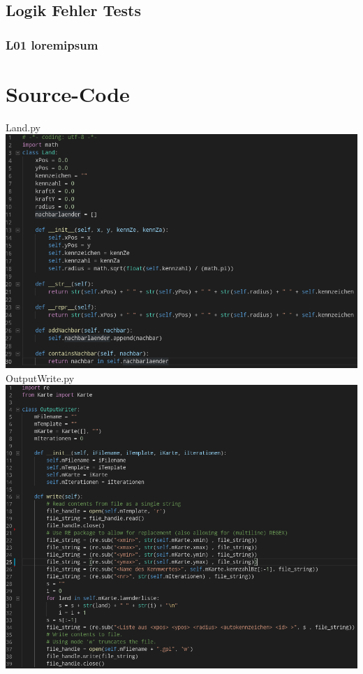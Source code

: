 \documentclass[a4paper,11pt]{article}
\begin{document}
{\subsection{Logik Fehler Tests}

\subsubsection{L01 loremipsum}

\section{Source-Code}
\begin{center}

\vbox{
Land.py\\
\includegraphics[width=\linewidth]{klasse_land_source.png}
}
\vbox{
OutputWrite.py\\
\includegraphics[width=\linewidth]{klasse_outputwrite_source.png}
}
\end{center}}
\end{document}
